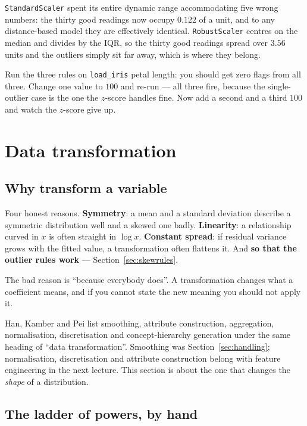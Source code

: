 \documentclass[11pt]{article}
\begin{document}
\texttt{StandardScaler} spent its entire dynamic range accommodating five wrong
numbers: the thirty good readings now occupy $0.122$ of a unit, and to any
distance-based model they are effectively identical.
\texttt{RobustScaler} centres on the median and divides by the IQR, so the
thirty good readings spread over $3.56$ units and the outliers simply sit far
away, which is where they belong.

\begin{tryit}
Run the three rules on \texttt{load\_iris} petal length: you should get zero
flags from all three. Change one value to $100$ and re-run --- all three fire,
because the single-outlier case is the one the $z$-score handles fine. Now add
a second and a third $100$ and watch the $z$-score give up.
\end{tryit}

\section{Data transformation}
\label{sec:transform}

\subsection{Why transform a variable}

Four honest reasons. \textbf{Symmetry}: a mean and a standard deviation
describe a symmetric distribution well and a skewed one badly.
\textbf{Linearity}: a relationship curved in $x$ is often straight in
$\log x$. \textbf{Constant spread}: if residual variance grows with the fitted
value, a transformation often flattens it. And \textbf{so that the outlier
rules work} --- Section~\ref{sec:skewrules}.

The bad reason is ``because everybody does''. A transformation changes what a
coefficient means, and if you cannot state the new meaning you should not
apply it.

Han, Kamber and Pei list smoothing, attribute construction, aggregation,
normalisation, discretisation and concept-hierarchy generation under the same
heading of ``data transformation''. Smoothing was Section~\ref{sec:handling};
normalisation, discretisation and attribute construction belong with feature
engineering in the next lecture. This section is about the one that changes the
\emph{shape} of a distribution.

\subsection{The ladder of powers, by hand}
\end{document}
